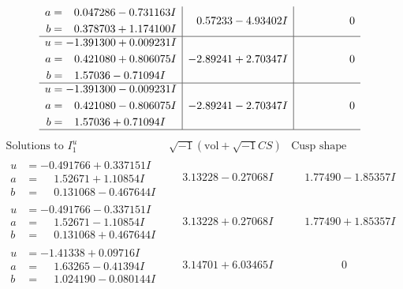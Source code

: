 \documentclass[1p]{elsarticle_modified}
\theoremstyle{definition}
\newcommand{\I}{\sqrt{-1}}
\begin{document}
$$\begin{array}{c|c|c}
\begin{aligned}
a &= \phantom{-}0.047286 - 0.731163 I \\
b &= \phantom{-}0.378703 + 1.174100 I\end{aligned}
 & \phantom{-}0.57233 - 4.93402 I & \phantom{-0.000000 } 0 \\ \hline\begin{aligned}
u &= -1.391300 + 0.009231 I \\
a &= \phantom{-}0.421080 + 0.806075 I \\
b &= \phantom{-}1.57036 - 0.71094 I\end{aligned}
 & -2.89241 + 2.70347 I & \phantom{-0.000000 } 0 \\ \hline\begin{aligned}
u &= -1.391300 - 0.009231 I \\
a &= \phantom{-}0.421080 - 0.806075 I \\
b &= \phantom{-}1.57036 + 0.71094 I\end{aligned}
 & -2.89241 - 2.70347 I & \phantom{-0.000000 } 0\\
 \hline 
 \end{array}$$\newpage$$\begin{array}{c|c|c}  
\text{Solutions to }I^u_{1}& \I (\text{vol} + \sqrt{-1}CS) & \text{Cusp shape}\\
 \hline 
\begin{aligned}
u &= -0.491766 + 0.337151 I \\
a &= \phantom{-}1.52671 + 1.10854 I \\
b &= \phantom{-}0.131068 - 0.467644 I\end{aligned}
 & \phantom{-}3.13228 - 0.27068 I & \phantom{-}1.77490 - 1.85357 I \\ \hline\begin{aligned}
u &= -0.491766 - 0.337151 I \\
a &= \phantom{-}1.52671 - 1.10854 I \\
b &= \phantom{-}0.131068 + 0.467644 I\end{aligned}
 & \phantom{-}3.13228 + 0.27068 I & \phantom{-}1.77490 + 1.85357 I \\ \hline\begin{aligned}
u &= -1.41338 + 0.09716 I \\
a &= \phantom{-}1.63265 - 0.41394 I \\
b &= \phantom{-}1.024190 - 0.080144 I\end{aligned}
 & \phantom{-}3.14701 + 6.03465 I & \phantom{-0.000000 } 0 \\ \hline\begin{aligned}

\end{aligned}
\end{array}$$
\end{document}
